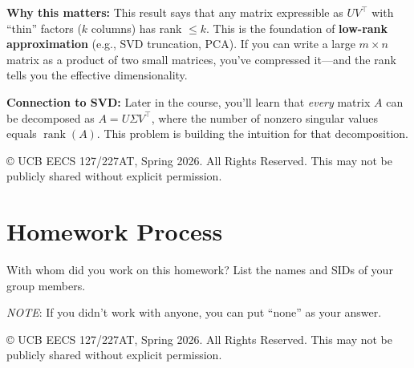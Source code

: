 \documentclass[10pt]{article}
\theoremstyle{definition}
\theoremstyle{plain}
\DeclareMathOperator{\rank}{rank}
\begin{document}
\begin{enumerate}[label=(\alph*)]
    \begin{intuition}
    \textbf{Why this matters:} This result says that any matrix expressible as $UV^\top$ with ``thin'' factors ($k$ columns) has rank $\leq k$. This is the foundation of \textbf{low-rank approximation} (e.g., SVD truncation, PCA). If you can write a large $m \times n$ matrix as a product of two small matrices, you've compressed it---and the rank tells you the effective dimensionality.

    \textbf{Connection to SVD:} Later in the course, you'll learn that \emph{every} matrix $A$ can be decomposed as $A = U\Sigma V^\top$, where the number of nonzero singular values equals $\rank(A)$. This problem is building the intuition for that decomposition.
    \end{intuition}
\end{enumerate}

\vfill
\noindent\footnotesize{\copyright{} UCB EECS 127/227AT, Spring 2026. \scriptsize{All Rights Reserved. This may not be publicly shared without explicit permission.}}

\newpage

\section{Homework Process}

With whom did you work on this homework? List the names and SIDs of your group members.

\textit{NOTE}: If you didn't work with anyone, you can put ``none'' as your answer.

\vfill
\noindent\footnotesize{\copyright{} UCB EECS 127/227AT, Spring 2026. \scriptsize{All Rights Reserved. This may not be publicly shared without explicit permission.}}
\end{document}
